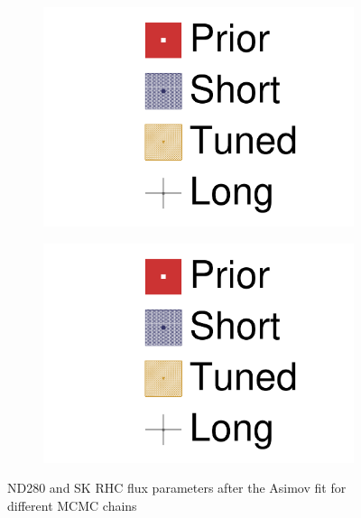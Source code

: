 \begin{figure}[h]
\begin{subfigure}[t]{0.24\textwidth}
		\includegraphics[width=\textwidth, trim={0mm 0mm 0mm 0mm}, clip,page=16]{figures/mach3/Asimov/2017_NewDet_Asimov_actually_0_2017b_NewDet_3Xsec_4Det_5Flux_NewXSecTune_Asimov_0_2017b_NewDet_NewData_Asimov_Long_0}
	\end{subfigure}
	\begin{subfigure}[t]{0.24\textwidth}
		\includegraphics[width=\textwidth, trim={0mm 0mm 0mm 0mm}, clip,page=17]{figures/mach3/Asimov/2017_NewDet_Asimov_actually_0_2017b_NewDet_3Xsec_4Det_5Flux_NewXSecTune_Asimov_0_2017b_NewDet_NewData_Asimov_Long_0}
	\end{subfigure}
	\caption{ND280 and SK RHC flux parameters after the Asimov fit for different MCMC chains}
	\label{fig:flux_asimov_rhc}
\end{figure}

